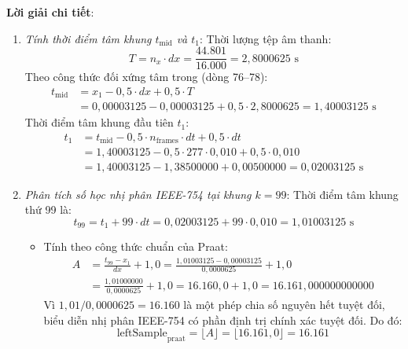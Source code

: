 \textbf{Lời giải chi tiết}:
\begin{enumerate}[label=(\alph*)]
    \item \emph{Tính thời điểm tâm khung $t_{\text{mid}}$ và $t_1$}:
    Thời lượng tệp âm thanh:
    \begin{equation}
        T = n_x \cdot dx = \frac{44.801}{16.000} = 2{,}8000625\text{ s}
    \end{equation}
    Theo công thức đối xứng tâm trong  (dòng 76--78):
    \begin{align}
        t_{\text{mid}} &= x_1 - 0{,}5 \cdot dx + 0{,}5 \cdot T \\
        &= 0{,}00003125 - 0{,}00003125 + 0{,}5 \cdot 2{,}8000625 = 1{,}40003125\text{ s}
    \end{align}
    Thời điểm tâm khung đầu tiên $t_1$:
    \begin{align}
        t_1 &= t_{\text{mid}} - 0{,}5 \cdot n_{\text{frames}} \cdot dt + 0{,}5 \cdot dt \\
        &= 1{,}40003125 - 0{,}5 \cdot 277 \cdot 0{,}010 + 0{,}5 \cdot 0{,}010 \\
        &= 1{,}40003125 - 1{,}38500000 + 0{,}00500000 = 0{,}02003125\text{ s}
    \end{align}

    \item \emph{Phân tích số học nhị phân IEEE-754 tại khung $k = 99$}:
    Thời điểm tâm khung thứ 99 là:
    \begin{equation}
        t_{99} = t_1 + 99 \cdot dt = 0{,}02003125 + 99 \cdot 0{,}010 = 1{,}01003125\text{ s}
    \end{equation}
    \begin{itemize}
        \item Tính theo công thức chuẩn của Praat:
        \begin{align}
            A &= \frac{t_{99} - x_1}{dx} + 1{,}0 = \frac{1{,}01003125 - 0{,}00003125}{0{,}0000625} + 1{,}0 \\
            &= \frac{1{,}01000000}{0{,}0000625} + 1{,}0 = 16.160{,}0 + 1{,}0 = 16.161{,}000000000000
        \end{align}
        Vì $1{,}01 / 0{,}0000625 = 16.160$ là một phép chia số nguyên hết tuyệt đối, biểu diễn nhị phân IEEE-754 có phần định trị chính xác tuyệt đối. Do đó:
        \begin{equation}
            \text{leftSample}_{\text{praat}} = \lfloor A \rfloor = \lfloor 16.161{,}0 \rfloor = 16.161
        \end{equation}


\end{itemize}
\end{enumerate}
